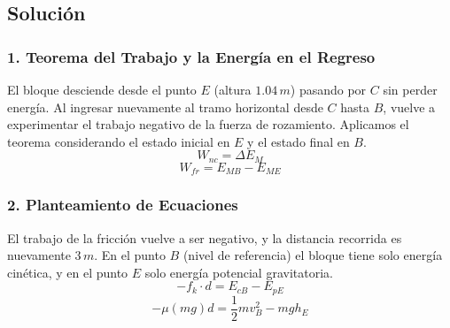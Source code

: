 \documentclass[12pt, a4paper]{article}
\begin{document}
\begin{center}
\end{center}

\subsection*{Solución}

\subsubsection*{1. Teorema del Trabajo y la Energía en el Regreso}
El bloque desciende desde el punto $E$ (altura $1.04 \, \si{m}$) pasando por $C$ sin perder energía. Al ingresar nuevamente al tramo horizontal desde $C$ hasta $B$, vuelve a experimentar el trabajo negativo de la fuerza de rozamiento.
Aplicamos el teorema considerando el estado inicial en $E$ y el estado final en $B$.
$$ W_{nc} = \Delta E_M $$
$$ W_{fr} = E_{MB} - E_{ME} $$

\subsubsection*{2. Planteamiento de Ecuaciones}
El trabajo de la fricción vuelve a ser negativo, y la distancia recorrida es nuevamente $3 \, \si{m}$. En el punto $B$ (nivel de referencia) el bloque tiene solo energía cinética, y en el punto $E$ solo energía potencial gravitatoria.
$$ -f_k \cdot d = E_{cB} - E_{pE} $$
$$ -\mu (mg) d = \frac{1}{2} m v_B^2 - m g h_E $$
\end{document}
